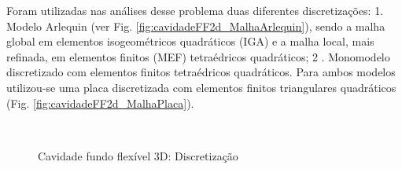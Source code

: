 \documentclass[tese_patricia]{subfiles}
\begin{document}
Foram utilizadas nas análises desse problema duas diferentes discretizações: 1. Modelo Arlequin (ver Fig. \ref{fig:cavidadeFF2d_MalhaArlequin}), sendo a malha global em elementos isogeométricos quadráticos (IGA) e a malha local, mais refinada, em elementos finitos (MEF) tetraédricos quadráticos; 2 . Monomodelo discretizado com elementos finitos tetraédricos quadráticos. Para ambos modelos utilizou-se uma placa discretizada com elementos finitos triangulares quadráticos (Fig. \ref{fig:cavidadeFF2d_MalhaPlaca}).

\begin{figure}[htb!]
	\centering
	\\ 
	\caption{Cavidade fundo flexível 3D: Discretização}
	
\end{figure}
\end{document}
